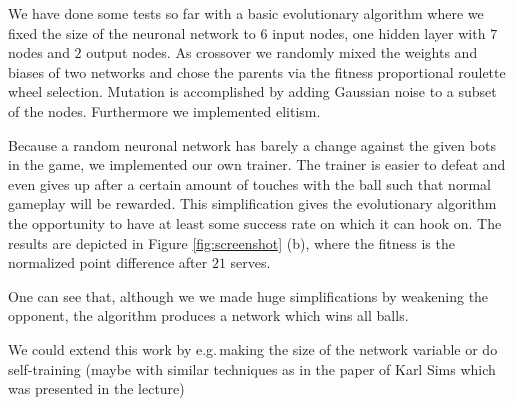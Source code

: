 \documentclass[11pt,a4paper]{scrartcl}
\begin{document}
We have done some tests so far with a basic evolutionary algorithm where we fixed the size of the neuronal network to $6$ input nodes, one hidden layer with $7$ nodes and $2$ output nodes.
As crossover we randomly mixed the weights and biases of two networks and chose the parents via the fitness proportional roulette wheel selection.
Mutation is accomplished by adding Gaussian noise to a subset of the nodes.
Furthermore we implemented elitism.

Because a random neuronal network has barely a change against the given bots in the game, we implemented our own trainer.
The trainer is easier to defeat and even gives up after a certain amount of touches with the ball such that normal gameplay will be rewarded.
This simplification gives the evolutionary algorithm the opportunity to have at least some success rate on which it can hook on.
The results are depicted in Figure \ref{fig:screenshot} (b), where the fitness is the normalized point difference after $21$ serves.

One can see that, although we we made huge simplifications by weakening the opponent, the algorithm produces a network which wins all balls.

We could extend this work by e.g.\,making the size of the network variable or do self-training (maybe with similar techniques as in the paper of Karl Sims which was presented in the lecture)
\end{document}
